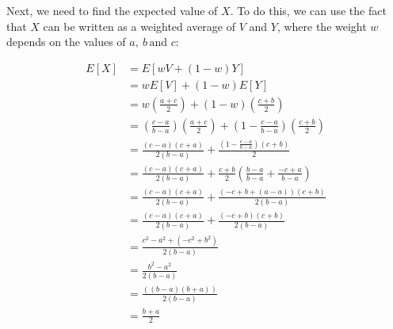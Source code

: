 \documentclass{article}
\begin{document}
\begin{enumerate}[label=\alph*)]
Next, we need to find the expected value of \(X\). To do this, we can use the fact that \(X\) can be written as a weighted average of \(V\) and \(Y\), where the weight \(w\) depends on the values of \(a,\ b\, \text{and } c\):

\begin{align*}
    E[X] &= E[wV + (1-w)Y] \\
    &= wE[V] + (1-w)E[Y] \\
    &= w\left(\frac{a + c}{2}\right) + (1-w)\left(\frac{c + b}{2}\right) \\
    &= \left(\frac{c-a}{b-a}\right) \left(\frac{a + c}{2}\right) + \left(1 - \frac{c-a}{b-a}\right) \left(\frac{c + b}{2}\right) \\
    &= \frac{(c - a)(c + a)}{2(b - a)} + \frac{(1 - \frac{c-a}{b-a})(c+b)}{2} \\
    &= \frac{(c - a)(c + a)}{2(b - a)} + \frac{c+b}{2}\left(\frac{b-a}{b-a}+\frac{-c+a}{b-a}\right) \\
    &= \frac{(c-a)(c+a)}{2(b-a)} + \frac{(-c+b+(a-a))(c+b)}{2(b-a)} \\
    &= \frac{(c-a)(c+a)}{2(b-a)} + \frac{(-c+b)(c+b)}{2(b-a)} \\
    &= \frac{c^2 - a^2 + (-c^2 + b^2)}{2(b-a)} \\
    &= \frac{b^2-a^2}{2(b-a)} \\
    &= \frac{((b-a)(b+a))}{2(b-a)} \\
    &= \frac{b+a}{2}
\end{align*}
\end{enumerate}
\end{document}
